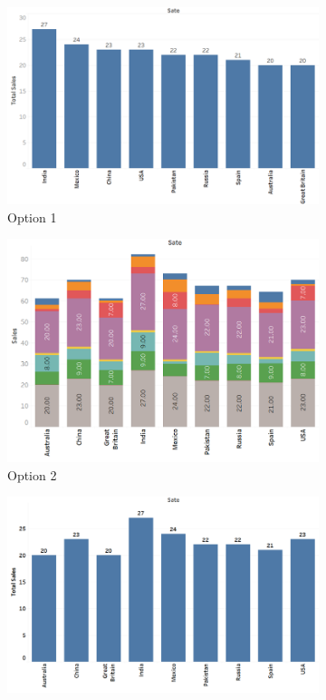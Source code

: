 \documentclass[11pt,fleqn]{book} %
\begin{document}
\begin{example}
\begin{figure}[hitb!]
  \centering
  \begin{subfigure}[c]{0.45\linewidth}
    \includegraphics[width=\linewidth]{Pictures/paq8-1.png}
    \caption{Option 1}
    \label{fig:pa1.8-op1}
  \end{subfigure}
  \hfill
  \begin{subfigure}[c]{0.45\linewidth}
    \includegraphics[width=\linewidth]{Pictures/paq8-2.png}
    \caption{Option 2}
    \label{fig:pa1.8-op2}
  \end{subfigure}
  \begin{subfigure}[c]{0.45\linewidth}
    \includegraphics[width=\linewidth]{Pictures/paq8-3.png}

\end{subfigure}
\end{figure}
\end{example}
\end{document}
